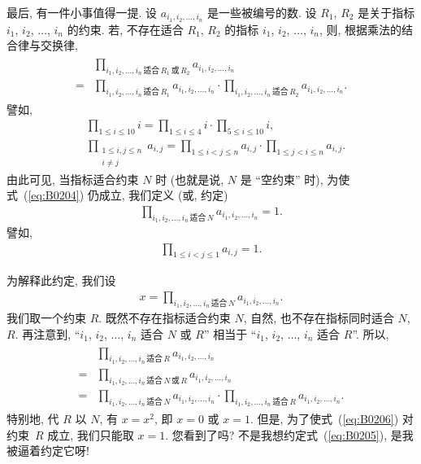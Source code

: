 \documentclass[%
    UTF8,%
    fontset=none,%
    punct=kaiming,%
    zihao=-4,%
    a4paper,%
    oneside,%
]{ctexbook}
\let\emph\relax
\renewcommand*{\leq}{\leqslant}
\begin{document}
最后, 有一件小事值得一提.
设 \(a_{i_1, i_2, \dots, i_n}\) 是一些被编号的数.
设 \(R_1\), \(R_2\)
是关于指标 \(i_1\), \(i_2\), \(\dots\), \(i_n\) 的约束.
若, 不存在\emph{同时}适合 \(R_1\), \(R_2\)
的指标 \(i_1\), \(i_2\), \(\dots\), \(i_n\),
则, 根据乘法的结合律与交换律,
\begin{align}
    \begin{aligned}
             & \prod_{i_1,i_2,\dots,i_n
            \,\text{适合}\,R_1\,\text{或}\,R_2}
        {a_{i_1, i_2, \dots, i_n}}
        \\
        = {} & \prod_{i_1,i_2,\dots,i_n\,\text{适合}\,R_1}
        {a_{i_1, i_2, \dots, i_n}}
        \cdot \prod_{i_1,i_2,\dots,i_n\,\text{适合}\,R_2}
        {a_{i_1, i_2, \dots, i_n}}.
    \end{aligned}
    \label{eq:B0204}
\end{align}
譬如,
\begin{align*}
     & \prod_{1 \leq i \leq 10} {i}
    = \prod_{1 \leq i \leq 4} {i}
    \cdot \prod_{5 \leq i \leq 10} {i},
    \\
     & \prod_{\substack{1 \leq i, j \leq n \\i \neq j}} {a_{i,j}}
    = \prod_{1 \leq i < j \leq n} {a_{i,j}}
    \cdot \prod_{1 \leq j < i \leq n} {a_{i,j}}.
\end{align*}
由此可见, 当\emph{不存在}指标适合约束 \(N\) 时
(也就是说, \(N\) 是 ``空约束'' 时),
为使式~(\ref{eq:B0204}) 仍成立,
我们定义 (或, 约定)
\begin{align}
    \prod_{i_1,i_2,\dots,i_n\,\text{适合}\,N}
    {a_{i_1, i_2, \dots, i_n}} = 1.
    \label{eq:B0205}
\end{align}
譬如,
\begin{align*}
    \prod_{1 \leq i < j \leq 1} {a_{i,j}} = 1.
\end{align*}

为解释此约定, 我们设
\begin{align*}
    x = \prod_{i_1,i_2,\dots,i_n\,\text{适合}\,N}
    {a_{i_1, i_2, \dots, i_n}}.
\end{align*}
我们\emph{任}取一个约束 \(R\).
既然不存在指标适合约束 \(N\),
自然, 也不存在指标同时适合 \(N\), \(R\).
再注意到,
``\(i_1\), \(i_2\), \(\dots\), \(i_n\)
适合 \(N\) 或 \(R\)''
相当于
``\(i_1\), \(i_2\), \(\dots\), \(i_n\)
适合 \(R\)''.
所以,
\begin{align}
    \begin{aligned}
             &
        \prod_{i_1,i_2,\dots,i_n\,\text{适合}\,R}
        {a_{i_1, i_2, \dots, i_n}}
        \\
        = {} &
        \prod_{i_1,i_2,\dots,i_n\,\text{适合}\,N\,\text{或}\,R}
        {a_{i_1, i_2, \dots, i_n}}
        \\
        = {} &
        \prod_{i_1,i_2,\dots,i_n\,\text{适合}\,N}
        {a_{i_1, i_2, \dots, i_n}}
        \cdot \prod_{i_1,i_2,\dots,i_n\,\text{适合}\,R}
        {a_{i_1, i_2, \dots, i_n}}.
    \end{aligned}
    \label{eq:B0206}
\end{align}
特别地, 代 \(R\) 以 \(N\), 有 \(x = x^2\),
即 \(x = 0\) 或 \(x = 1\).
但是, 为了使式~(\ref{eq:B0206})
对\emph{任意的}约束~\(R\) 成立,
我们只能取 \(x = 1\).
您看到了吗?
不是我想约定式~(\ref{eq:B0205}),
是我被逼着约定它呀!
\end{document}
